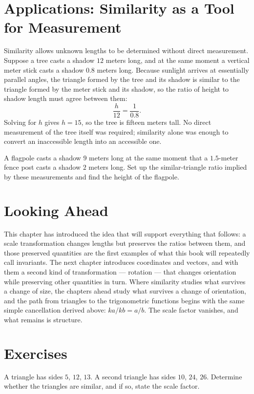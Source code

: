 \section{Applications: Similarity as a Tool for Measurement}

Similarity allows unknown lengths to be determined without direct
measurement. Suppose a tree casts a shadow $12$ meters long, and at the same
moment a vertical meter stick casts a shadow $0.8$ meters long. Because
sunlight arrives at essentially parallel angles, the triangle formed by the
tree and its shadow is similar to the triangle formed by the meter stick and
its shadow, so the ratio of height to shadow length must agree between them:
\[
\frac{h}{12} = \frac{1}{0.8}.
\]
Solving for $h$ gives $h = 15$, so the tree is fifteen meters tall. No direct
measurement of the tree itself was required; similarity alone was enough to
convert an inaccessible length into an accessible one.

\begin{practicenow}
A flagpole casts a shadow $9$ meters long at the same moment that a
$1.5$-meter fence post casts a shadow $2$ meters long. Set up the
similar-triangle ratio implied by these measurements and find the height of
the flagpole.
\end{practicenow}

\section{Looking Ahead}

This chapter has introduced the idea that will support everything that
follows: a scale transformation changes lengths but preserves the ratios
between them, and those preserved quantities are the first examples of what
this book will repeatedly call invariants. The next chapter introduces
coordinates and vectors, and with them a second kind of transformation ---
rotation --- that changes orientation while preserving other quantities in
turn. Where similarity studies what survives a change of size, the chapters
ahead study what survives a change of orientation, and the path from
triangles to the trigonometric functions begins with the same simple
cancellation derived above: $ka/kb = a/b$. The scale factor vanishes, and
what remains is structure.

\section{Exercises}
\begin{exercise}
A triangle has sides $5$, $12$, $13$. A second triangle has sides $10$,
$24$, $26$. Determine whether the triangles are similar, and if so, state the
scale factor.
\end{exercise}


